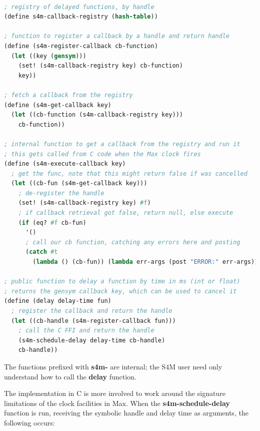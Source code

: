 \documentclass[acmsmall, anonymous, review]{acmart}
\begin{document}
\begin{lstlisting}[language=lisp]

; registry of delayed functions, by handle 
(define s4m-callback-registry (hash-table))

; function to register a callback by a handle and return handle
(define (s4m-register-callback cb-function)
  (let ((key (gensym)))
    (set! (s4m-callback-registry key) cb-function)
    key))

; fetch a callback from the registry 
(define (s4m-get-callback key)
  (let ((cb-function (s4m-callback-registry key)))
    cb-function))

; internal function to get a callback from the registry and run it
; this gets called from C code when the Max clock fires
(define (s4m-execute-callback key)
  ; get the func, note that this might return false if was cancelled
  (let ((cb-fun (s4m-get-callback key)))
    ; de-register the handle
    (set! (s4m-callback-registry key) #f)
    ; if callback retrieval got false, return null, else execute 
    (if (eq? #f cb-fun) 
      '()
      ; call our cb function, catching any errors here and posting
      (catch #t 
        (lambda () (cb-fun)) (lambda err-args (post "ERROR:" err-args))))))

; public function to delay a function by time in ms (int or float)
; returns the gensym callback key, which can be used to cancel it
(define (delay delay-time fun)
  ; register the callback and return the handle
  (let ((cb-handle (s4m-register-callback fun)))
    ; call the C FFI and return the handle
    (s4m-schedule-delay delay-time cb-handle)
    cb-handle))

\end{lstlisting}

The functions prefixed with \textbf{s4m-} are internal; the S4M user 
need only understand how to call the \textbf{delay} function.

The implementation in C is more involved to work around the signature 
limitations of the clock facilities in Max.
When the \textbf{s4m-schedule-delay} function is run, receiving the symbolic handle
and delay time as arguments, the following occurs:
\end{document}
